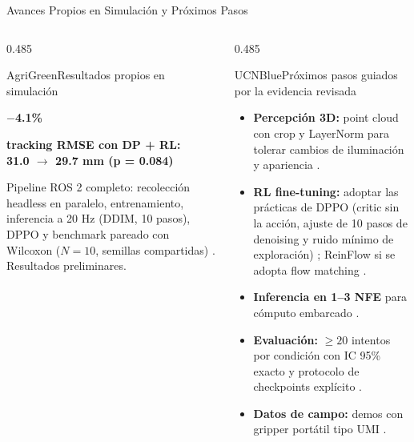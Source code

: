 \documentclass[aspectratio=169,10pt,xcolor={dvipsnames,table}]{beamer}
\newcommand{\FootnoteFont}{\fontsize{5}{6.2}\selectfont}                %
\newcommand{\KpiNumberFont}{\fontsize{11}{12.5}\selectfont\bfseries}    %
\newcommand{\KpiLabelFont}{\fontsize{5.2}{6.5}\selectfont\bfseries}     %
\newcommand{\CardHeightTall}{46mm}         %
\newcommand{\RefNote}[1]{{\FootnoteFont\textcolor{TextDark!65}{\cite{#1}}}}
\newcommand{\NoteFont}{\fontsize{5.6}{6.9}\selectfont}                  %
\newcommand{\TabFont}{\fontsize{5.3}{6.4}\selectfont}                    %
\begin{document}
\begin{frame}{Avances Propios en Simulación y Próximos Pasos}
\begin{columns}[T, onlytextwidth]
\begin{column}{0.485\textwidth}
\begin{Card}[height=\CardHeightTall]{AgriGreen}{Resultados propios en simulación}
\begin{minipage}[t]{0.48\linewidth}
        \end{minipage}\hfill
        \begin{minipage}[t]{0.48\linewidth}\centering
          {\KpiNumberFont\textcolor{AgriGreenDark}{$-$4.1\%}}\par\vspace{0.3mm}
          {\KpiLabelFont\textcolor{TextDark!80}{tracking RMSE con DP + RL:\\31.0 $\to$ 29.7 mm (p = 0.084)}\par}
        \end{minipage}\par\vspace{2.5mm}
        {\TabFont\raggedright\textcolor{TextDark!80}{Pipeline ROS 2 completo: recolección headless en paralelo, entrenamiento, inferencia a 20 Hz (DDIM, 10 pasos), DPPO y benchmark pareado con Wilcoxon ($N{=}10$, semillas compartidas) \RefNote{halton1960efficiency,wilcoxon1945individual}. Resultados preliminares.}\par}
      \end{Card}
    \end{column}
    \begin{column}{0.485\textwidth}
      \begin{Card}[height=\CardHeightTall]{UCNBlue}{Próximos pasos guiados por la evidencia revisada}
        {\NoteFont
        \begin{itemize}\setlength{\itemsep}{1pt}
          \item[\textcolor{UCNBlue}{$\blacktriangleright$}] \textbf{Percepción 3D:} point cloud con crop y LayerNorm para tolerar cambios de iluminación y apariencia \RefNote{ze2024dp3}.
          \item[\textcolor{UCNBlue}{$\blacktriangleright$}] \textbf{RL fine-tuning:} adoptar las prácticas de DPPO (critic sin la acción, ajuste de 10 pasos de denoising y ruido mínimo de exploración) \RefNote{ren2025dppo}; ReinFlow si se adopta flow matching \RefNote{zhang2025reinflow}.
          \item[\textcolor{UCNBlue}{$\blacktriangleright$}] \textbf{Inferencia en 1--3 NFE} para cómputo embarcado \RefNote{prasad2024consistency,ding2025rfmp}.
          \item[\textcolor{UCNBlue}{$\blacktriangleright$}] \textbf{Evaluación:} $\geq 20$ intentos por condición con IC 95\% exacto \RefNote{rong2026tomato} y protocolo de checkpoints explícito \RefNote{chi2025diffusion}.
          \item[\textcolor{UCNBlue}{$\blacktriangleright$}] \textbf{Datos de campo:} demos con gripper portátil tipo UMI \RefNote{chi2024umi,kim2025pepper}.
        \end{itemize}}
      \end{Card}
    \end{column}
  \end{columns}
\end{frame}
\end{document}
